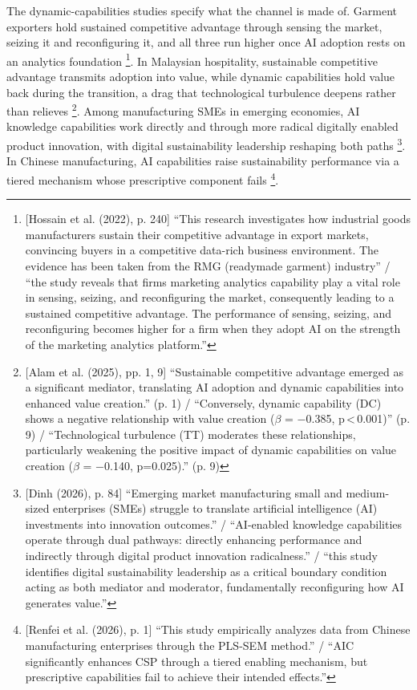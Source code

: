 The dynamic-capabilities studies specify what the channel is made of. Garment exporters hold sustained competitive advantage through sensing the market, seizing it and reconfiguring it, and all three run higher once AI adoption rests on an analytics foundation \parencite[p.~240]{hossain2022marketing}\footnote{[Hossain et al. (2022), p. 240] ``This research investigates how industrial goods manufacturers sustain their competitive advantage in export markets, convincing buyers in a competitive data-rich business environment. The evidence has been taken from the RMG (readymade garment) industry'' / ``the study reveals that firms marketing analytics capability play a vital role in sensing, seizing, and reconfiguring the market, consequently leading to a sustained competitive advantage. The performance of sensing, seizing, and reconfiguring becomes higher for a firm when they adopt AI on the strength of the marketing analytics platform.''}. In Malaysian hospitality, sustainable competitive advantage transmits adoption into value, while dynamic capabilities hold value back during the transition, a drag that technological turbulence deepens rather than relieves \parencite[pp.~1, 9]{alam2025relationship}\footnote{[Alam et al. (2025), pp. 1, 9] ``Sustainable competitive advantage emerged as a significant mediator, translating AI adoption and dynamic capabilities into enhanced value creation.'' (p. 1) / ``Conversely, dynamic capability (DC) shows a negative relationship with value creation ($\beta$ = $-$0.385, p\,\textless\,0.001)'' (p. 9) / ``Technological turbulence (TT) moderates these relationships, particularly weakening the positive impact of dynamic capabilities on value creation ($\beta$ = $-$0.140, p=0.025).'' (p. 9)}. Among manufacturing SMEs in emerging economies, AI knowledge capabilities work directly and through more radical digitally enabled product innovation, with digital sustainability leadership reshaping both paths \parencite[p.~84]{dinh2026leveraging}\footnote{[Dinh (2026), p. 84] ``Emerging market manufacturing small and medium-sized enterprises (SMEs) struggle to translate artificial intelligence (AI) investments into innovation outcomes.'' / ``AI-enabled knowledge capabilities operate through dual pathways: directly enhancing performance and indirectly through digital product innovation radicalness.'' / ``this study identifies digital sustainability leadership as a critical boundary condition acting as both mediator and moderator, fundamentally reconfiguring how AI generates value.''}. In Chinese manufacturing, AI capabilities raise sustainability performance via a tiered mechanism whose prescriptive component fails \parencite[p.~1]{renfei2026exploring}\footnote{[Renfei et al. (2026), p. 1] ``This study empirically analyzes data from Chinese manufacturing enterprises through the PLS-SEM method.'' / ``AIC significantly enhances CSP through a tiered enabling mechanism, but prescriptive capabilities fail to achieve their intended effects.''}.

